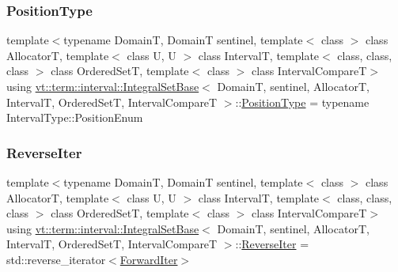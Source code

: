 \mbox{\label{structvt_1_1term_1_1interval_1_1_integral_set_base_a04700201180ff07417358d70c9ac5c82}} 
\subsubsection{\texorpdfstring{Position\+Type}{PositionType}}
{\footnotesize\ttfamily template$<$typename DomainT, DomainT sentinel, template$<$ class $>$ class AllocatorT, template$<$ class U, U $>$ class IntervalT, template$<$ class, class, class $>$ class Ordered\+SetT, template$<$ class $>$ class Interval\+CompareT$>$ \\
using \hyperlink{structvt_1_1term_1_1interval_1_1_integral_set_base}{vt\+::term\+::interval\+::\+Integral\+Set\+Base}$<$ DomainT, sentinel, AllocatorT, IntervalT, Ordered\+SetT, Interval\+CompareT $>$\+::\hyperlink{structvt_1_1term_1_1interval_1_1_integral_set_base_a04700201180ff07417358d70c9ac5c82}{Position\+Type} =  typename Interval\+Type\+::\+Position\+Enum}

\mbox{\label{structvt_1_1term_1_1interval_1_1_integral_set_base_af36c82de08ca3e67714c9051d9f3db92}} 
\subsubsection{\texorpdfstring{Reverse\+Iter}{ReverseIter}}
{\footnotesize\ttfamily template$<$typename DomainT, DomainT sentinel, template$<$ class $>$ class AllocatorT, template$<$ class U, U $>$ class IntervalT, template$<$ class, class, class $>$ class Ordered\+SetT, template$<$ class $>$ class Interval\+CompareT$>$ \\
using \hyperlink{structvt_1_1term_1_1interval_1_1_integral_set_base}{vt\+::term\+::interval\+::\+Integral\+Set\+Base}$<$ DomainT, sentinel, AllocatorT, IntervalT, Ordered\+SetT, Interval\+CompareT $>$\+::\hyperlink{structvt_1_1term_1_1interval_1_1_integral_set_base_af36c82de08ca3e67714c9051d9f3db92}{Reverse\+Iter} =  std\+::reverse\+\_\+iterator$<$\hyperlink{structvt_1_1term_1_1interval_1_1_integral_set_base_abd0d7f40a96384d2db0a2782a8921a34}{Forward\+Iter}$>$}



